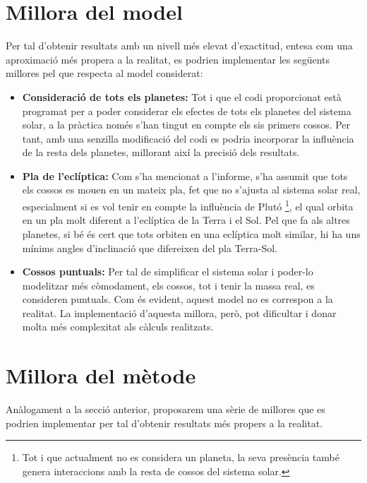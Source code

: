 \documentclass[10pt, twoside, a4paper]{article}
\begin{document}
\section{Millora del model}
\label{an:d}
Per tal d'obtenir resultats amb un nivell més elevat d'exactitud, entesa com una aproximació més propera a la realitat, es podrien implementar les següents millores pel que respecta al model considerat:
\begin{itemize}
    \item \textbf{Consideració de tots els planetes: } Tot i que el codi proporcionat està programat per a poder considerar els efectes de tots els planetes del sistema solar, a la pràctica només s'han tingut en compte els sis primers cossos. Per tant, amb una senzilla modificació del codi es podria incorporar la influència de la resta dels planetes, millorant així la precisió dels resultats.
    \item \textbf{Pla de l'eclíptica: } Com s'ha mencionat a l'informe, s'ha assumit que tots els cossos es mouen en un mateix pla, fet que no s'ajusta al sistema solar real, especialment si es vol tenir en compte la influència de Plutó \footnote{Tot i que actualment no es considera un planeta, la seva presència també genera interaccions amb la resta de cossos del sistema solar.}, el qual orbita en un pla molt diferent a l'eclíptica de la Terra i el Sol. Pel que fa als altres planetes, si bé és cert que tots orbiten en una eclíptica molt similar, hi ha uns mínims angles d'inclinació que difereixen del pla Terra-Sol.
    \item \textbf{Cossos puntuals: }Per tal de simplificar el sistema solar i poder-lo modelitzar més còmodament, els cossos, tot i tenir la massa real, es consideren puntuals. Com és evident, aquest model no es correspon a la realitat. La implementació d'aquesta millora, però, pot dificultar i donar molta més complexitat als càlculs realitzats.
\end{itemize}

\section{Millora del mètode}
\label{an:e}
Anàlogament a la secció anterior, proposarem una sèrie de millores que es podrien implementar per tal d'obtenir resultats més propers a la realitat.
\end{document}
